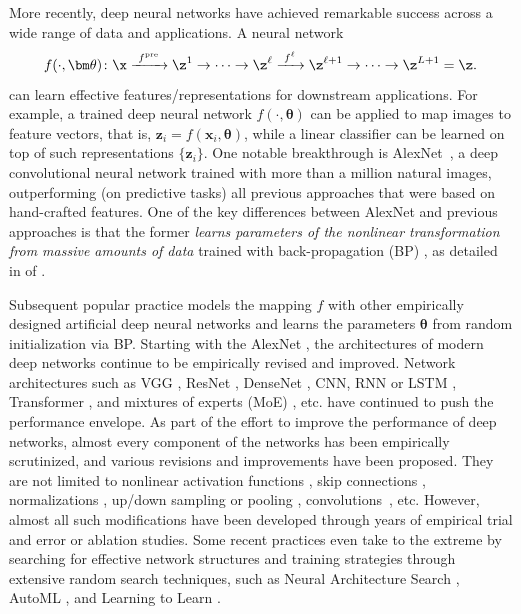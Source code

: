\documentclass[../../book-main.tex]{subfiles}
\begin{document}
More recently, deep neural networks have achieved remarkable success
across a wide range of data and applications. A neural network
\begin{equation}
    f(\cdot, \bm \theta) \colon \x
    \xrightarrow{\hspace{1mm} f^{\mathrm{pre}} \hspace{1mm}} \z^1
    \rightarrow \cdots
    \rightarrow \z^\ell \xrightarrow{\hspace{1mm} f^\ell \hspace{1mm}}
    \z^{\ell+1} \rightarrow  \cdots \to \z^{L+1} = \z.
\end{equation}
can learn effective features/representations for downstream
applications. For example, a trained deep neural network $f(\cdot,
\bm \theta)$ can be applied to map images to feature vectors, that
is, $\bm{z}_i = f(\bm{x}_i,\bm \theta)$, while a linear classifier
can be learned on top of such representations $\{\bm{z}_i\}$. One
notable breakthrough is AlexNet~\cite{krizhevsky2012imagenet}, a deep
convolutional neural network trained with more than a million natural
images, outperforming (on predictive tasks) all previous approaches
that were based on hand-crafted features. One of the key
differences between AlexNet and previous approaches is that the
former \textit{learns parameters of the nonlinear transformation from
massive amounts of data} trained with back-propagation (BP)
\cite{Back-Prop}, as detailed in  of
.

Subsequent popular practice models the mapping $f$ with other
empirically designed artificial deep neural networks and learns the
parameters $\bm \theta$ from random initialization via BP. Starting
with the AlexNet \cite{krizhevsky2012imagenet}, the architectures of
modern deep networks continue to be empirically revised and improved.
Network architectures such as VGG \cite{simonyan2014very}, ResNet
\cite{he2016deep}, DenseNet \cite{dense-net}, CNN, RNN or LSTM
\cite{LSTM}, Transformer \cite{vaswani2017attention}, and mixtures
of experts (MoE) \cite{MoE,Fedus-2022}, etc. have continued to push
the performance envelope. As part of the effort to improve the
performance of deep networks, almost every component of the networks
has been empirically scrutinized, and various revisions and
improvements have been proposed. They are not limited to nonlinear
activation functions
\cite{maas2013rectifier,klambauer2017self,xu2015empirical,nwankpa2018activation},
skip connections \cite{ronneberger2015u,he2016deep}, normalizations
\cite{ioffe2015batch,ba2016layer,ulyanov2016instance,wu2018group,miyato2018spectral},
up/down sampling or pooling \cite{scherer2010evaluation},
convolutions~\cite{lecun1998gradient,krizhevsky2012imagenet}, etc.
However, almost all such modifications have been developed through
years of empirical {trial and error} or ablation studies. Some recent
practices even take to the extreme by searching for effective network
structures and training strategies through extensive random search
techniques, such as Neural Architecture Search
\cite{NAS-1,Baker2017DesigningNN}, AutoML \cite{automl}, and Learning
to Learn \cite{andrychowicz2016learning}.
\end{document}
